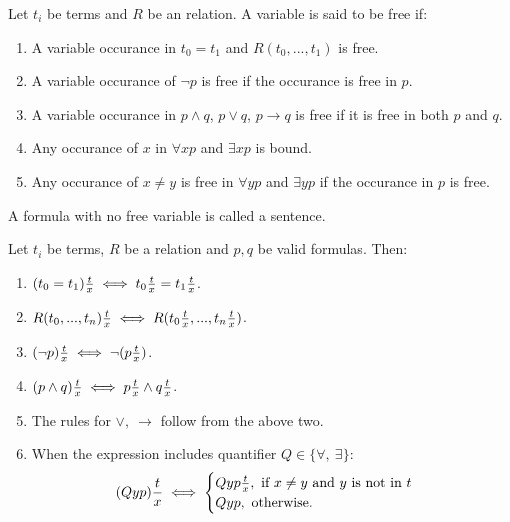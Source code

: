 \begin{definition}
  Let $t_i$ be terms and $R$ be an relation. A variable is said to be free if:
  \begin{enumerate}
    \item A variable occurance in $t_0=t_1$ and $R(t_0,...,t_1)$ is free.
    \item A variable occurance of $\lnot p$ is free if the occurance is free in $p$.
    \item A variable occurance in $p\land q$, $p \lor q$, $p\to q$ is free if it is free in both $p$ and $q$.
    \item Any occurance of $x$ in $\forall xp$ and $\exists xp$ is bound.
    \item Any occurance of $x\neq y$ is free in $\forall yp$ and $\exists yp$ if the occurance in $p$ is free.
  \end{enumerate}
\end{definition}
\begin{definition}
  A formula with no free variable is called a sentence.
\end{definition}
\begin{definition}
  Let $t_i$ be terms, $R$ be a relation and $p,q$ be valid formulas. Then:
  \begin{enumerate}
    \item $(t_0=t_1)\frac{t}{x} \iff t_0\frac{t}{x} = t_1\frac{t}{x}$.
    \item $R(t_0,...,t_n)\frac{t}{x} \iff R(t_0\frac{t}{x},...,t_n\frac{t}{x})$.
    \item $(\lnot p) \frac{t}{x}\iff \lnot(p\frac{t}{x})$.
    \item $(p\land q)\frac{t}{x} \iff p\frac{t}{x}\land q\frac{t}{x}$.
    \item The rules for $\lor,\ \to$ follow from the above two.
    \item When the expression includes quantifier $Q\in \{\forall,\ \exists\}$:
      \begin{align*}
        (Q yp)\frac{t}{x} \iff \begin{cases}
          Q y p\frac{t}{x},\ \text{if $x\neq y$ and $y$ is not in $t$}\\
          Q yp,\ \text{otherwise}. 
        \end{cases}
      \end{align*}
  \end{enumerate}
\end{definition}
